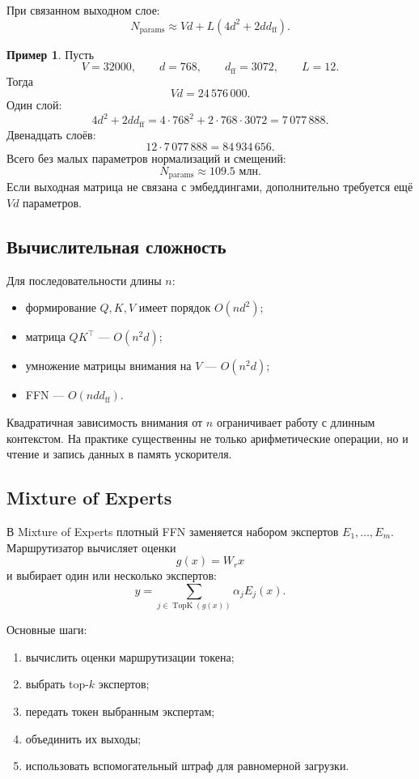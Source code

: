 \documentclass[12pt,a4paper]{article}
\newcommand{\1}{\mathbf{1}}
\theoremstyle{definition}
\newtheorem{example}[theorem]{Пример}
\theoremstyle{remark}
\begin{document}
При связанном выходном слое:
\[
N_{\mathrm{params}}
\approx
Vd+
L\left(4d^2+2dd_{\mathrm{ff}}\right).
\]

\begin{example}
Пусть
\[
V=32000,\qquad
d=768,\qquad
d_{\mathrm{ff}}=3072,\qquad
L=12.
\]
Тогда
\[
Vd=24\,576\,000.
\]
Один слой:
\[
4d^2+2dd_{\mathrm{ff}}
=
4\cdot768^2+2\cdot768\cdot3072
=
7\,077\,888.
\]
Двенадцать слоёв:
\[
12\cdot7\,077\,888=84\,934\,656.
\]
Всего без малых параметров нормализаций и смещений:
\[
N_{\mathrm{params}}\approx109.5\text{ млн}.
\]
Если выходная матрица не связана с эмбеддингами, дополнительно требуется
ещё $Vd$ параметров.
\end{example}

\subsection{Вычислительная сложность}

Для последовательности длины $n$:

\begin{itemize}
    \item формирование $Q,K,V$ имеет порядок $O(nd^2)$;
    \item матрица $QK^\top$ --- $O(n^2d)$;
    \item умножение матрицы внимания на $V$ --- $O(n^2d)$;
    \item FFN --- $O(ndd_{\mathrm{ff}})$.
\end{itemize}

Квадратичная зависимость внимания от $n$ ограничивает работу с длинным
контекстом. На практике существенны не только арифметические операции,
но и чтение и запись данных в память ускорителя.

\subsection{Mixture of Experts}

В Mixture of Experts плотный FFN заменяется набором экспертов
$E_1,\ldots,E_m$. Маршрутизатор вычисляет оценки
\[
g(x)=W_rx
\]
и выбирает один или несколько экспертов:
\[
y=\sum_{j\in\operatorname{TopK}(g(x))}
\alpha_jE_j(x).
\]

Основные шаги:

\begin{enumerate}
    \item вычислить оценки маршрутизации токена;
    \item выбрать top-$k$ экспертов;
    \item передать токен выбранным экспертам;
    \item объединить их выходы;
    \item использовать вспомогательный штраф для равномерной загрузки.
\end{enumerate}
\end{document}
